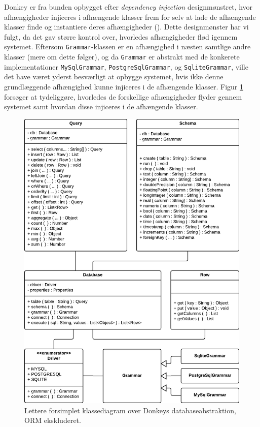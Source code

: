Donkey er fra bunden opbygget efter \textit{dependency injection} designmønstret, hvor afhængigheder injiceres i afhængende klasser frem for selv at lade de afhængende klasser finde og instantiere deres afhængigheder (\cite{wiki:di}). Dette designmønster har vi fulgt, da det gav større kontrol over, hvorledes afhængigheder flød igennem systemet. Eftersom \texttt{Grammar}-klassen er en afhængighed i næsten samtlige andre klasser (mere om dette følger), og da \texttt{Grammar} er abstrakt med de konkerete implementationer \texttt{MySqlGrammar}, \texttt{PostgreSqlGrammar}, og \texttt{SqliteGrammar}, ville det have været yderst besværligt at opbygge systemet, hvis ikke denne grundlæggende afhængighed kunne injiceres i de afhængende klasser. Figur \ref{class-diagram:database-abstraction} forsøger at tydeliggøre, hvorledes de forskellige afhængigheder flyder gennem systemet samt hvordan disse injiceres i de afhængende klasser.

\begin{figure}[h]
  \centering
  \includegraphics[scale=0.75]{images/database-abstraction.pdf}
  \caption{Lettere forsimplet klassediagram over Donkeys databaseabstraktion, ORM ekskluderet.}
  \label{class-diagram:database-abstraction}
\end{figure}

